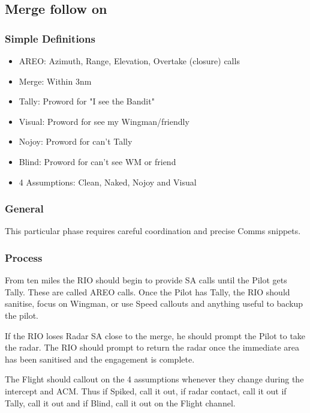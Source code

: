 \subsection{Merge follow on}

\subsubsection*{Simple Definitions}

\begin{itemize}

  \item AREO: Azimuth, Range, Elevation, Overtake (closure) calls
  \item Merge: Within 3nm
  \item Tally: Proword for "I see the Bandit"
  \item Visual: Proword for see my Wingman/friendly
  \item Nojoy: Proword for can't Tally
  \item Blind: Proword for can't see WM or friend
  \item 4 Assumptions: Clean, Naked, Nojoy and Visual

\end{itemize}

\subsubsection*{General}

This particular phase requires careful coordination and precise Comms snippets.

\subsubsection*{Process}

From ten miles the RIO should begin to provide SA calls until the Pilot gets
Tally. These are called AREO calls. Once the Pilot has Tally, the RIO should
sanitise, focus on Wingman, or use Speed callouts and anything useful to backup
the pilot.

If the RIO loses Radar SA close to the merge, he should prompt the Pilot to
take the radar. The RIO should prompt to return the radar once the immediate
area has been sanitised and the engagement is complete.

The Flight should callout on the 4 assumptions whenever they change during the
intercept and ACM. Thus if Spiked, call it out, if radar contact, call it out
if Tally, call it out and if Blind, call it out on the Flight channel.


